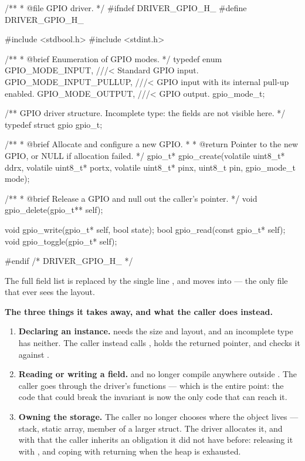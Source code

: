 
\begin{ccode}
/**
 * @file GPIO driver.
 */
#ifndef DRIVER_GPIO_H_
#define DRIVER_GPIO_H_

#include <stdbool.h>
#include <stdint.h>

/**
 * @brief Enumeration of GPIO modes.
 */
typedef enum
{
    GPIO_MODE_INPUT,        ///< Standard GPIO input.
    GPIO_MODE_INPUT_PULLUP, ///< GPIO input with its internal pull-up enabled.
    GPIO_MODE_OUTPUT,       ///< GPIO output.
} gpio_mode_t;

/** GPIO driver structure. Incomplete type: the fields are not visible here. */
typedef struct gpio gpio_t;

/**
 * @brief Allocate and configure a new GPIO.
 *
 * @return Pointer to the new GPIO, or NULL if allocation failed.
 */
gpio_t* gpio_create(volatile uint8_t* ddrx, volatile uint8_t* portx, volatile uint8_t* pinx,
                    uint8_t pin, gpio_mode_t mode);

/**
 * @brief Release a GPIO and null out the caller's pointer.
 */
void gpio_delete(gpio_t** self);

void gpio_write(gpio_t* self, bool state);
bool gpio_read(const gpio_t* self);
void gpio_toggle(gpio_t* self);

#endif /* DRIVER_GPIO_H_ */
\end{ccode}

\noindent The full field list is replaced by the single line , and
 moves into  --- the only file that ever sees the layout.

\textbf{The three things it takes away, and what the caller does instead.} 
\begin{enumerate}
  \item \textbf{Declaring an instance.}  needs the size and layout, and
    an incomplete type has neither. The caller instead calls , holds the
    returned pointer, and checks it against .
  \item \textbf{Reading or writing a field.}  and  no longer compile
    anywhere outside . The caller goes through the driver's functions --- which is the
    entire point: the code that could break the invariant is now the only code that can reach it.
  \item \textbf{Owning the storage.} The caller no longer chooses where the object lives --- stack,
    static array, member of a larger struct. The driver allocates it, and with that the caller
    inherits an obligation it did not have before: releasing it with , and
    coping with  returning  when the heap is exhausted.
\end{enumerate}

